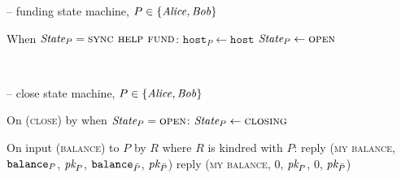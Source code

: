 \begin{center}
\begin{systembox}{\fchan{} -- funding state machine, $P \in \{\mathit{Alice}, \mathit{Bob}\}$}
\begin{algorithmic}[1]
      \State When $\itistate_P = \textsc{sync help fund}$:
      \Indent
          \State $\texttt{host}_P \gets \texttt{host}$
          \State {}
          \State $\itistate_P \gets \textsc{open}$
          \label{code:functionality:fund:help-fund-end}
        \EndIf
      \EndIndent
    \end{algorithmic}
  \end{systembox}
  \label{code:functionality:fund}
\end{center} \ \\

\begin{center}
  \begin{systembox}{\fchan{} -- close state machine, $P \in \{\mathit{Alice},
  \mathit{Bob}\}$}
    \begin{algorithmic}[1]
      \State On (\textsc{close}) by \environment when $\itistate_P =
      \textsc{open}$:
      \Indent
        \State $\itistate_P \gets \textsc{closing}$
      \EndIndent
      \Statex

      \State On input (\textsc{balance}) to $P$ by $R$ where $R$ is kindred with
      $P$:
      \Indent
          \State reply (\textsc{my balance}, $\texttt{balance}_{P}$, $\textit{pk}_{P}$,
          $\texttt{balance}_{\bar{P}}$, $\textit{pk}_{\bar{P}}$)
        \Else
          \State reply (\textsc{my balance}, $0$, $\textit{pk}_{P}$, $0$, $\textit{pk}_{\bar{P}}$)
        \EndIf
      \EndIndent
      \Statex


\end{algorithmic}
\end{systembox}
\end{center}

